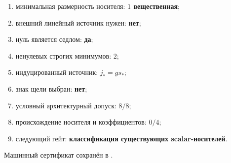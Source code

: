 \begin{protocol}\begin{enumerate}
\item минимальная размерность носителя: \textbf{$1$ вещественная};
\item внешний линейный источник нужен: \textbf{нет};
\item нуль является седлом: \textbf{да};
\item ненулевых строгих минимумов: \textbf{$2$};
\item индуцированный источник: \textbf{$j_*=gs_*$};
\item знак щели выбран: \textbf{нет};
\item условный архитектурный допуск: \textbf{$8/8$};
\item происхождение носителя и коэффициентов: \textbf{$0/4$};
\item следующий гейт: \textbf{классификация существующих scalar-носителей}.
\end{enumerate}\end{protocol}

Машинный сертификат сохранён в
.